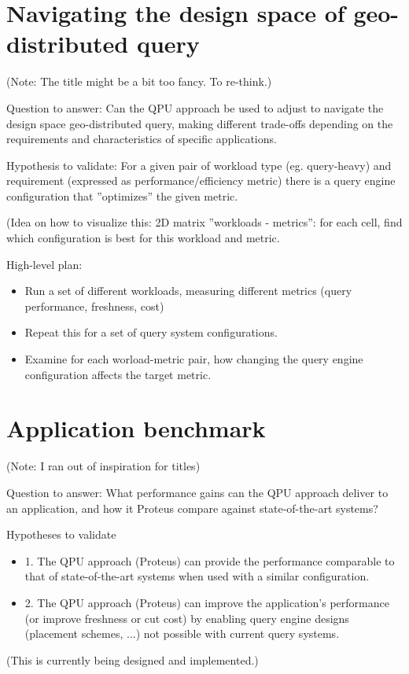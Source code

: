 \section{Navigating the design space of geo-distributed query}
(Note: The title might be a bit too fancy. To re-think.)

Question to answer:
Can the QPU approach be used to adjust to navigate the design space
geo-distributed query, making different trade-offs depending on the requirements
and characteristics of specific applications.

Hypothesis to validate:
For a given pair of workload type (eg. query-heavy) and requirement (expressed
as performance/efficiency metric) there is a query engine configuration that
''optimizes'' the given metric.

(Idea on how to visualize this: 2D matrix ''workloads - metrics'':
for each cell, find which configuration is best for this workload and metric.

High-level plan:
\begin{itemize}
  \item Run a set of different workloads, measuring different metrics (query
  performance, freshness, cost)
  \item Repeat this for a set of query system configurations.
  \item Examine for each worload-metric pair, how changing the query engine
  configuration affects the target metric.
\end{itemize}

\section{Application benchmark}
(Note: I ran out of inspiration for titles)

Question to answer:
What performance gains can the QPU approach deliver to an application, and how
it Proteus compare against state-of-the-art systems?

Hypotheses to validate
\begin{itemize}
  \item 1. The QPU approach (Proteus) can provide the performance comparable to
  that of state-of-the-art systems when used with a similar configuration.
  \item 2. The QPU approach (Proteus) can improve the application's performance
  (or improve freshness or cut cost) by enabling query engine designs (placement
  schemes, ...) not possible with current query systems.
\end{itemize}

(This is currently being designed and implemented.)